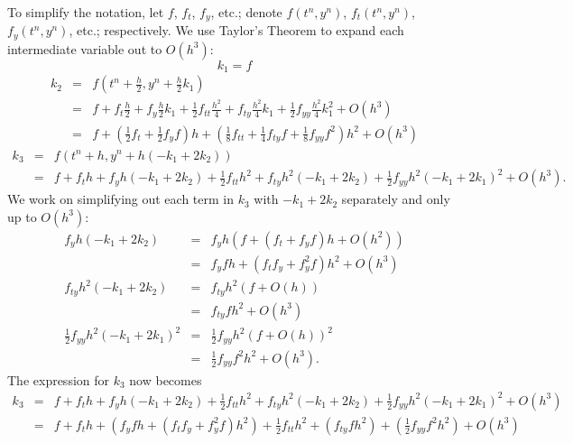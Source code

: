 \documentclass{article}
\begin{document}
\begin{enumerate}
To simplify the notation, let \(f\), \(f_t\), \(f_y\), etc.; denote \(f(t^n,y^n)\), \(f_t(t^n,y^n)\), \(f_y(t^n,y^n)\), etc.; respectively.  We use Taylor's Theorem to expand each intermediate variable out to \(O(h^3)\):
\[k_1 = f\]
\begin{eqnarray*}
k_2 & = & f \left( t^n + \frac{h}{2}, y^n + \frac{h}{2} k_1 \right) \\
    & = & f + f_t \frac{h}{2} + f_y \frac{h}{2} k_1
            + \frac{1}{2} f_{tt} \frac{h^2}{4} + f_{ty} \frac{h^2}{4} k_1 + \frac{1}{2} f_{yy} \frac{h^2}{4} k_1^2
            + O(h^3) \\
    & = & f + \left( \frac{1}{2} f_t + \frac{1}{2} f_y f \right) h
            + \left( \frac{1}{8} f_{tt} + \frac{1}{4} f_{ty} f + \frac{1}{8} f_{yy} f^2 \right) h^2
            + O(h^3)
\end{eqnarray*}
\begin{eqnarray*}
k_3 & = & f \left( t^n + h, y^n + h (-k_1 + 2k_2) \right) \\
    & = & f + f_t h + f_y h (-k_1 + 2k_2)
            + \frac{1}{2} f_{tt} h^2 + f_{ty} h^2 (-k_1 + 2k_2) + \frac{1}{2} f_{yy} h^2 (-k_1 + 2k_1)^2
            + O(h^3).
\end{eqnarray*}
We work on simplifying out each term in \(k_3\) with \(-k_1 + 2k_2\) separately and only up to \(O(h^3)\):
\begin{eqnarray*}
f_y h (-k_1 + 2k_2)
& = & f_y h \left( f + \left( f_t + f_y f \right) h + O(h^2) \right) \\
& = & f_y f h + \left( f_t f_y + f_y^2 f \right) h^2 + O(h^3) \\
f_{ty} h^2 (-k_1 + 2k_2)
& = & f_{ty} h^2 \left( f + O(h) \right) \\
& = & f_{ty} f h^2 + O(h^3) \\
\frac{1}{2} f_{yy} h^2 (-k_1 + 2k_1)^2
& = & \frac{1}{2} f_{yy} h^2 \left( f + O(h) \right)^2 \\
& = & \frac{1}{2} f_{yy} f^2 h^2 + O(h^3).
\end{eqnarray*}
The expression for \(k_3\) now becomes
\begin{eqnarray*}
k_3 & = & f + f_t h + f_y h (-k_1 + 2k_2)
            + \frac{1}{2} f_{tt} h^2 + f_{ty} h^2 (-k_1 + 2k_2) + \frac{1}{2} f_{yy} h^2 (-k_1 + 2k_1)^2
            + O(h^3) \\
    & = & f + f_t h + \left( f_y f h + \left( f_t f_y + f_y^2 f \right) h^2 \right)
            + \frac{1}{2} f_{tt} h^2 + \left( f_{ty} f h^2 \right) + \left( \frac{1}{2} f_{yy} f^2 h^2 \right)
            + O(h^3) \\

\end{eqnarray*}
\end{enumerate}
\end{document}
